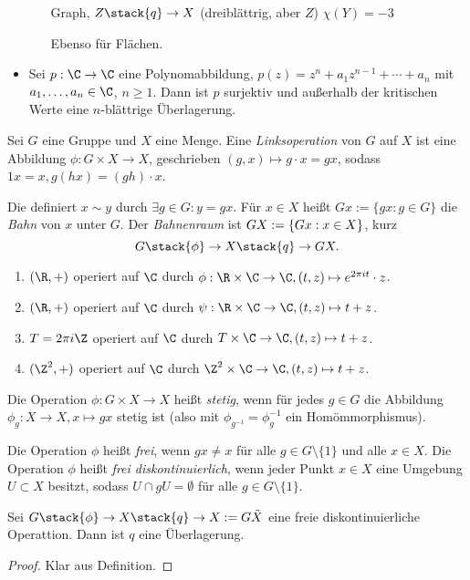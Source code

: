 \begin{ex}
\begin{itemize}
\begin{itemize}
					Graph, $Z \stack{q}\to X$ (dreiblättrig, aber $Z$)
					$\chi(Y) = -3$

					Ebenso für Flächen.
			\end{itemize}
		\item
			Sei $p: \C \to \C$ eine Polynomabbildung, $p(z) = z^n + a_1 z^{n-1} + \dotsb + a_n$ mit $a_1, \dotsc, a_n \in \C$, $n \ge 1$.
			Dann ist $p$ surjektiv und außerhalb der kritischen Werte eine $n$-blättrige Überlagerung.
	\end{itemize}
\end{ex}

\begin{df}
	Sei $G$ eine Gruppe und $X$ eine Menge.
	Eine \emph{Linksoperation} von $G$ auf $X$ ist eine Abbildung $\phi: G \times X \to X$, geschrieben $(g, x) \mapsto g \cdot x = gx$, sodass $1 x = x, g(hx) = (gh) \cdot x$.

	Die definiert $x \sim y$ durch $\exists g \in G: y = gx$.
	Für $x \in X$ heißt $Gx := \{gx : g \in G\}$ die \emph{Bahn} von $x$ unter $G$.
	Der \emph{Bahnenraum} ist $G \\ X := \{ Gx : x \in X \}$, kurz
	\[
		G \stack{\phi}\to X \stack{q}\surto G \\ X.
	\]
\end{df}

\begin{ex}
	\begin{enumerate}[1)]
		\item
			$(\R, +)$ operiert auf $\C$ durch $\phi: \R \times \C \to \C, (t, z) \mapsto e^{2\pi i t} \cdot z$.
		\item
			$(\R, +)$ operiert auf $\C$ durch $\psi: \R \times \C \to \C, (t, z) \mapsto t + z$.
		\item
			$T = 2\pi i \Z$ operiert auf $\C$ durch $T \times \C \to \C, (t, z) \mapsto t + z$.
		\item
			$(\Z^2, +)$ operiert auf $\C$ durch $\Z^2 \times \C \to \C, (t, z) \mapsto t + z$.
	\end{enumerate}
\end{ex}

\begin{df}
	Die Operation $\phi: G \times X \to X$ heißt \emph{stetig}, wenn für jedes $g \in G$ die Abbildung $\phi_g: X \to X, x \mapsto gx$ stetig ist (also mit $\phi_{g^{-1}} = \phi_{g}^{-1}$ ein Homömmorphismus).

	Die Operation $\phi$ heißt \emph{frei}, wenn $gx \neq x$ für alle $g \in G \setminus \{1\}$ und alle $x \in X$.
	Die Operation $\phi$ heißt \emph{frei diskontinuierlich}, wenn jeder Punkt $x \in X$ eine Umgebung $U \subset X$ besitzt, sodass $U \cap g U = \emptyset$ für alle $g \in G \setminus \{1\}$.
\end{df}


\begin{st}
	Sei $G \stack{\phi}\to X \stack{q}\to X := G \\ \tilde X$ eine freie diskontinuierliche Operattion.
	Dann ist $q$ eine Überlagerung.
	\begin{proof}
		Klar aus Definition.
	\end{proof}
\end{st}
